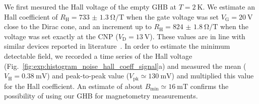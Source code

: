 We first mesured the Hall voltage of the empty \gls{GHB} at $T=\SI{2}{\kelvin}$. We estimate an Hall coefficient of $R_\textrm{H} = \SI[separate-uncertainty = true]{733(1.3)}{\ohm\per\tesla}$ when the gate voltage was set $V_\textrm{G}=\SI{20}{\volt}$ close to the Dirac cone, and an increment up to $R_\textrm{H} = \SI[separate-uncertainty = true]{824(1.8)}{\ohm\per\tesla}$ when the voltage was set exactly at the CNP ($V_\textrm{D}=\SI{13}{\volt}$). These values are in line with similar devices reported in literature~\cite{collomb2021frontiers}. In order to estimate the minimum detectable field, we recorded a time series of the Hall voltage (Fig.~\ref{fig:exp:histogram_noise_hall_coeff_signal}a) and measured the mean ($V_\textrm{H}=\SI{0.38}{\milli\volt}$) and peak-to-peak value ($V_\textrm{pk}\simeq\SI{130}{\milli\volt}$) and multiplied this value for the Hall coefficient. An estimate of about $B_\textrm{min}\simeq\SI{16}{\milli\tesla}$ confirms the possibility of using our \gls{GHB} for magnetometry measurements.

